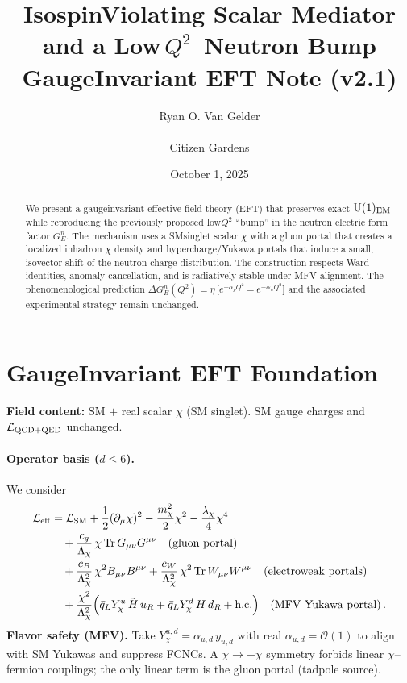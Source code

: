 \documentclass[11pt]{article}
\title{Isospin\mbox{\textendash}Violating Scalar Mediator and a Low\mbox{\(\,Q^2\,\)} Neutron Bump\\\large Gauge\mbox{\textendash}Invariant EFT Note (v2.1)}
\author{Ryan O. Van Gelder \\ \\ Citizen Gardens}
\date{October 1, 2025}
\newcommand{\UoneEM}{\mathrm{U}(1)_{\rm EM}}
\newcommand{\GN}{G_E^n}
\newcommand{\Tr}{\mathrm{Tr}}
\newcommand{\Lag}{\mathcal{L}}
\begin{document}
\maketitle

\begin{abstract}
We present a gauge\mbox{\textendash}invariant effective field theory (EFT) that preserves exact $\UoneEM$ while reproducing the previously proposed low\mbox{$Q^2$} ``bump'' in the neutron electric form factor $\GN$. The mechanism uses a SM\mbox{\textendash}singlet scalar $\chi$ with a gluon portal that creates a localized in\mbox{\textendash}hadron $\chi$ density and hypercharge/Yukawa portals that induce a small, isovector shift of the neutron charge distribution. The construction respects Ward identities, anomaly cancellation, and is radiatively stable under MFV alignment. The phenomenological prediction $\Delta \GN(Q^2)=\eta\,\big[e^{-\alpha_p Q^2}-e^{-\alpha_n Q^2}\big]$ and the associated experimental strategy remain unchanged.
\end{abstract}

\section{Gauge\mbox{\textendash}Invariant EFT Foundation}
\textbf{Field content:} SM $+$ real scalar $\chi$ (SM singlet). SM gauge charges and $\Lag_{\rm QCD+QED}$ unchanged.

\paragraph{Operator basis ($d\le 6$).} We consider
\begin{align}
\Lag_{\rm eff}&=\Lag_{\rm SM}+\frac{1}{2}(\partial_\mu\chi)^2-\frac{m_\chi^2}{2}\chi^2-\frac{\lambda_\chi}{4}\chi^4\\
&\quad+\frac{c_g}{\Lambda_\chi}\,\chi\,\Tr\,G_{\mu\nu}G^{\mu\nu}\quad\text{(gluon portal)}\\
&\quad+\frac{c_B}{\Lambda_\chi^2}\,\chi^2 B_{\mu\nu}B^{\mu\nu}+\frac{c_W}{\Lambda_\chi^2}\,\chi^2\,\Tr\,W_{\mu\nu}W^{\mu\nu}\quad\text{(electroweak portals)}\\
&\quad+\frac{\chi^2}{\Lambda_\chi^2}\Big(\bar q_L Y_\chi^u\,\tilde H\,u_R+\bar q_L Y_\chi^d\,H\,d_R+\text{h.c.}\Big)\quad\text{(MFV Yukawa portal)}\,.
\end{align}
\textbf{Flavor safety (MFV).} Take $Y_\chi^{u,d}=\alpha_{u,d}\,y_{u,d}$ with real $\alpha_{u,d}=\mathcal{O}(1)$ to align with SM Yukawas and suppress FCNCs. A $\chi\to-\chi$ symmetry forbids linear $\chi$--fermion couplings; the only linear term is the gluon portal (tadpole source).
\end{document}

